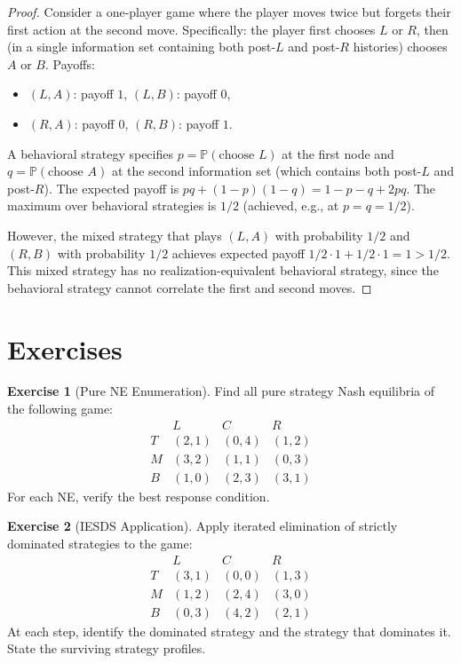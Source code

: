 \documentclass[11pt,a4paper]{article}
\theoremstyle{definition}
\newtheorem{exercise}{Exercise}[section]
\theoremstyle{plain}
\theoremstyle{remark}
\newcommand{\Prob}{\mathbb{P}}
\begin{document}
\begin{proof}
Consider a one-player game where the player moves twice but forgets their first action
at the second move. Specifically: the player first chooses $L$ or $R$, then (in a
single information set containing both post-$L$ and post-$R$ histories) chooses
$A$ or $B$. Payoffs:
\begin{itemize}[nosep]
    \item $(L, A)$: payoff $1$, \quad $(L, B)$: payoff $0$,
    \item $(R, A)$: payoff $0$, \quad $(R, B)$: payoff $1$.
\end{itemize}
A behavioral strategy specifies $p = \Prob(\text{choose } L)$ at the first node and
$q = \Prob(\text{choose } A)$ at the second information set (which contains both
post-$L$ and post-$R$). The expected payoff is $pq + (1-p)(1-q) = 1 - p - q + 2pq$.
The maximum over behavioral strategies is $1/2$ (achieved, e.g., at $p = q = 1/2$).

However, the mixed strategy that plays $(L, A)$ with probability $1/2$ and $(R, B)$
with probability $1/2$ achieves expected payoff $1/2 \cdot 1 + 1/2 \cdot 1 = 1 > 1/2$.
This mixed strategy has no realization-equivalent behavioral strategy, since the
behavioral strategy cannot correlate the first and second moves.
\end{proof}

\section{Exercises}
\label{sec:exercises}

\begin{exercise}[Pure NE Enumeration]
\label{ex:pure_ne}
Find all pure strategy Nash equilibria of the following game:
\[
\begin{array}{c|ccc}
 & L & C & R \\ \hline
T & (2,1) & (0,4) & (1,2) \\
M & (3,2) & (1,1) & (0,3) \\
B & (1,0) & (2,3) & (3,1)
\end{array}
\]
For each NE, verify the best response condition.
\end{exercise}

\begin{exercise}[IESDS Application]
\label{ex:iesds}
Apply iterated elimination of strictly dominated strategies to the game:
\[
\begin{array}{c|ccc}
 & L & C & R \\ \hline
T & (3,1) & (0,0) & (1,3) \\
M & (1,2) & (2,4) & (3,0) \\
B & (0,3) & (4,2) & (2,1)
\end{array}
\]
At each step, identify the dominated strategy and the strategy that dominates it.
State the surviving strategy profiles.
\end{exercise}
\end{document}
